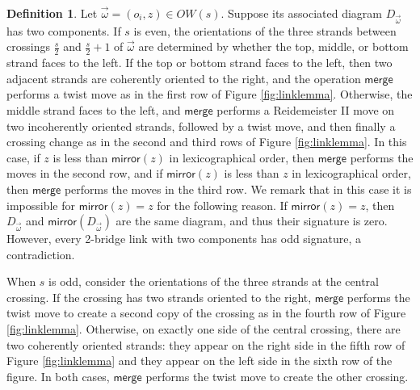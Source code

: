 \documentclass[12pt]{amsart}
\theoremstyle{definition}
\newtheorem{definition}[theorem]{Definition}
\theoremstyle{remark}
\numberwithin{equation}{section}
\newcommand{\mirror}{\textsf{mirror}}
\newcommand{\merge}{\textsf{merge}}
\begin{document}
\begin{definition}
\label{def:merge}
Let $\vec{\omega}=(o_i,z)\in OW(s)$. Suppose its associated diagram $D_{\vec{\omega}}$ has two components. If $s$ is even, the orientations of the three strands between crossings $\frac{s}{2}$ and $\frac{s}{2}+1$ of $\vec{\omega}$ are determined by whether the top, middle, or bottom strand faces to the left.  If the top or bottom strand faces to the left, then two adjacent strands are coherently oriented to the right, and the operation $\merge$ performs a twist move as in the first row of Figure \ref{fig:linklemma}. Otherwise, the middle strand faces to the left, and $\merge$ performs a Reidemeister II move on two incoherently oriented strands, followed by a twist move, and then finally a crossing change as in the second and third rows of Figure \ref{fig:linklemma}. In this case, if $z$ is less than $\mirror(z)$ in lexicographical order, then  $\merge$ performs the moves in the second row, and if $\mirror(z)$ is less than $z$ in lexicographical order, then $\merge$ performs the moves in the third row. We remark that in this case it is impossible for $\mirror(z)=z$ for the following reason. If $\mirror(z)=z$, then $D_{\vec{\omega}}$ and $\mirror(D_{\vec{\omega}})$ are the same diagram, and thus their signature is zero. However, every 2-bridge link with two components has odd signature, a contradiction. 

When $s$ is odd, consider the orientations of the three strands at the central crossing.  If the crossing has two strands oriented to the right, $\merge$ performs the twist move to create a second copy of the crossing as in the fourth row of Figure \ref{fig:linklemma}.  Otherwise, on exactly one side of the central crossing, there are two coherently oriented strands:  they appear on the right side in the fifth row of Figure \ref{fig:linklemma} and they appear on the left side in the sixth row of the figure.  In both cases, $\merge$ performs the twist move to create the other crossing.

\end{definition}

%
%
\end{document}
